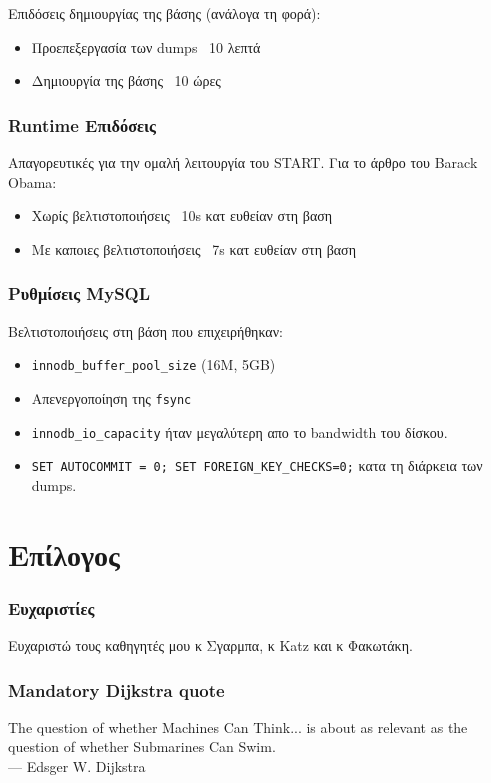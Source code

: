 \documentclass[bigger]{beamer}
\begin{document}
\begin{frame}
  Επιδόσεις δημιουργίας της βάσης (ανάλογα τη φορά):

  \begin{itemize}
  \item Προεπεξεργασία των dumps ~10 λεπτά
  \item Δημιουργία της βάσης ~10 ώρες
  \end{itemize}
\end{frame}

\begin{frame}
  \frametitle{Runtime Επιδόσεις}

  Απαγορευτικές για την ομαλή λειτουργία του START. Για το άρθρο του
  Barack Obama:
  \begin{itemize}
  \item Χωρίς βελτιστοποιήσεις ~10s κατ ευθείαν στη βαση
  \item Με καποιες βελτιστοποιήσεις ~7s κατ ευθείαν στη βαση
  \end{itemize}
\end{frame}

\begin{frame}
  \frametitle{Ρυθμίσεις MySQL}

  Βελτιστοποιήσεις στη βάση που επιχειρήθηκαν:

  \begin{itemize}
  \item \texttt{innodb\_buffer\_pool\_size} \in (16Μ, 5GB)
  \item Απενεργοποίηση της \texttt{fsync}
  \item \texttt{innodb_io_capacity} ήταν μεγαλύτερη απο το bandwidth
    του δίσκου.
  \item \texttt{SET AUTOCOMMIT = 0; SET FOREIGN_KEY_CHECKS=0;} κατα τη
    διάρκεια των dumps.
  \end{itemize}
\end{frame}

\section{Επίλογος}

\begin{frame}
  \frametitle{Ευχαριστίες}

  Ευχαριστώ τους καθηγητές μου κ Σγαρμπα, κ Katz και κ Φακωτάκη.

\end{frame}

\begin{frame}
  \frametitle{Mandatory Dijkstra quote}

  \vfill
  The question of whether Machines Can Think... is about as relevant as the question of whether Submarines Can Swim.\\
  \hfill --- Edsger W. Dijkstra
  \vfill

\end{frame}
\end{document}
